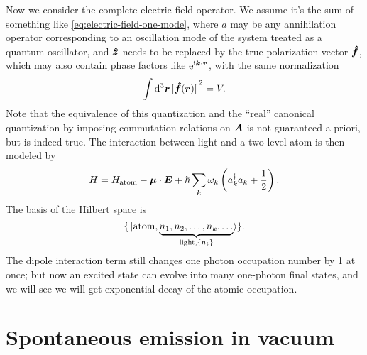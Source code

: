 \documentclass[hyperref, a4paper]{article}
\newcommand*{\ii}{\mathrm{i}}
\newcommand*{\ee}{\mathrm{e}}
\begin{document}
Now we consider the complete electric field operator.
We assume it's the sum of something like \eqref{eq:electric-field-one-mode},
where $a$ may be any annihilation operator 
corresponding to an oscillation mode of the system 
treated as a quantum oscillator,
and $\vu*{z}$ needs to be replaced by the true polarization vector $\vu*{f}$, 
which may also contain phase factors like $\ee^{\ii \vb*{k} \cdot \vb*{r}}$,
with the same normalization
\begin{equation}
    \int \dd[3]{\vb*{r}} \abs*{\vu*{f}(\vb*{r})}^2 = V.
\end{equation} 
Note that the equivalence of this quantization 
and the ``real'' canonical quantization 
by imposing commutation relations on $\vb*{A}$ 
is not guaranteed a priori, but is indeed true.
The interaction between light and a two-level atom is then modeled by 
\begin{equation}
    H = H_{\text{atom}} - \vb*{\mu} \cdot \vb*{E} + \hbar  \sum_k \omega_k \left(
        a^\dagger_k a_k + \frac{1}{2}
    \right).
\end{equation}
The basis of the Hilbert space is 
\begin{equation}
    \{
        \ket*{
            \text{atom}, \underbrace{
                n_1, n_2, \ldots, n_k, \ldots
            }_{\text{light}, \{n_i\}} 
        }
    \}.
    \label{eq:complete-light-mattery}
\end{equation}
The dipole interaction term still 
changes one photon occupation number by 1 at once; 
but now an excited state can evolve into many 
one-photon final states, 
and we will see we will get exponential decay 
of the atomic occupation. 

\section{Spontaneous emission in vacuum}
\end{document}
